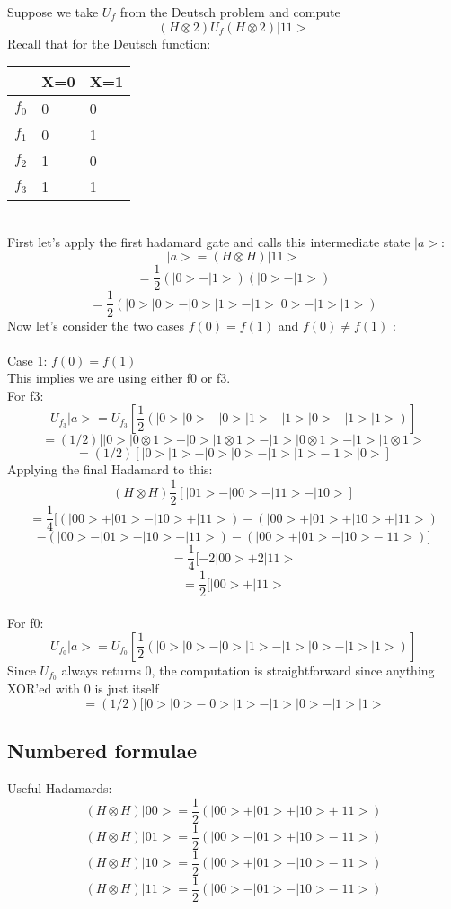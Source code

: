 \documentclass[12pt]{article}
\begin{document}
Suppose we take $U_{f}$ from the Deutsch problem and compute
$$(H\otimes 2)U_{f} (H\otimes 2)|11>$$
Recall that for the Deutsch function:
\\
\begin{table}
    \begin{tabular}{|l|l|l|}
        \hline
        ~  & X=0 & X=1 \\ \hline
        $f_{0}$ & 0   & 0   \\ \hline
        $f_{1}$ & 0   & 1   \\  \hline
        $f_{2}$ & 1   & 0   \\ \hline
        $f_{3}$ & 1   & 1   \\
        \hline
    \end{tabular}
\end{table}
\\
First let's apply the first hadamard gate and calls this intermediate state $|a>$:
$$|a> = (H\otimes H)|11>$$
$$= \frac{1}{2} (|0> - |1>)(|0> - |1>)$$
$$=\frac{1}{2}(|0>|0> - |0>|1> - |1>|0> - |1>|1>)$$
Now let's consider the two cases $f(0)=f(1)$ and $f(0) \neq f(1)$ :
\\\\ Case 1: $f(0)=f(1)$
\\This implies we are using either f0 or f3.
\\For f3:
$$ U_{f_{3}}|a> = U_{f_{3}} [\frac{1}{2}(|0>|0> - |0>|1> - |1>|0> - |1>|1>) ]$$
$$ = (1/2)[|0>|0 \otimes 1> - |0>|1 \otimes 1> - |1>|0 \otimes 1> - |1>|1 \otimes 1>$$
$$ = (1/2)[|0>|1> - |0>|0> - |1>|1> - |1>|0>] $$
Applying the final Hadamard to this:
$$(H\otimes H)\frac{1}{2}[|01> - |00> - |11> - |10>] $$
$$ = \frac{1}{4}[ (|00> + |01> - |10> + |11>) -  (|00> + |01> + |10> + |11>)$$$$- (|00> - |01> - |10> - |11>) - (|00> + |01> - |10> - |11>)]$$
$$ = \frac{1}{4}[-2|00> + 2|11>$$
$$ = \frac{1}{2}[|00> + |11>$$
\\For f0:
$$ U_{f_{0}}|a> = U_{f_{0}} [\frac{1}{2}(|0>|0> - |0>|1> - |1>|0> - |1>|1>) ]$$
Since $U_{f_{0}}$ always returns 0, the computation is straightforward since anything XOR'ed with 0 is just itself
$$ = (1/2)[|0>|0> - |0>|1> - |1>|0> - |1>|1>$$


\subsection{Numbered formulae}

Useful Hadamards:
\begin{equation}
	(H\otimes H) |00> = \frac{1}{2}(|00> + |01> + |10> + |11>)
\end{equation}
\begin{equation}
	(H\otimes H) |01> = \frac{1}{2}(|00> - |01> + |10> - |11>)
\end{equation}
\begin{equation}
	(H\otimes H) |10> = \frac{1}{2}(|00> + |01> - |10> - |11>)
\end{equation}
\begin{equation}
	(H\otimes H) |11> = \frac{1}{2}(|00> - |01> - |10> - |11>)
\end{equation}
\end{document}
